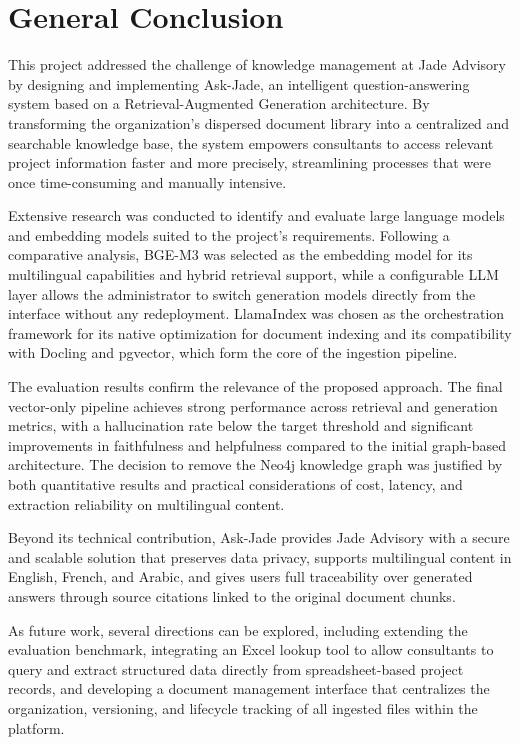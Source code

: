 \chapter*{General Conclusion}

This project addressed the challenge of knowledge management at Jade
Advisory by designing and implementing Ask-Jade, an intelligent
question-answering system based on a Retrieval-Augmented Generation
architecture. By transforming the organization's dispersed document
library into a centralized and searchable knowledge base, the system
empowers consultants to access relevant project information faster and
more precisely, streamlining processes that were once time-consuming
and manually intensive.

Extensive research was conducted to identify and evaluate large language
models and embedding models suited to the project's requirements.
Following a comparative analysis, BGE-M3 was selected as the embedding
model for its multilingual capabilities and hybrid retrieval support,
while a configurable LLM layer allows the administrator to switch
generation models directly from the interface without any redeployment.
LlamaIndex was chosen as the orchestration framework for its native
optimization for document indexing and its compatibility with Docling
and pgvector, which form the core of the ingestion pipeline.

The evaluation results confirm the relevance of the proposed approach.
The final vector-only pipeline achieves strong performance across
retrieval and generation metrics, with a hallucination rate below the
target threshold and significant improvements in faithfulness and
helpfulness compared to the initial graph-based architecture. The
decision to remove the Neo4j knowledge graph was justified by both
quantitative results and practical considerations of cost, latency,
and extraction reliability on multilingual content.

Beyond its technical contribution, Ask-Jade provides Jade Advisory
with a secure and scalable solution that preserves data privacy,
supports multilingual content in English, French, and Arabic, and
gives users full traceability over generated answers through source
citations linked to the original document chunks.

As future work, several directions can be explored, including extending
the evaluation benchmark, integrating an Excel lookup tool to allow
consultants to query and extract structured data directly from
spreadsheet-based project records, and developing a document management
interface that centralizes the organization, versioning, and lifecycle
tracking of all ingested files within the platform.